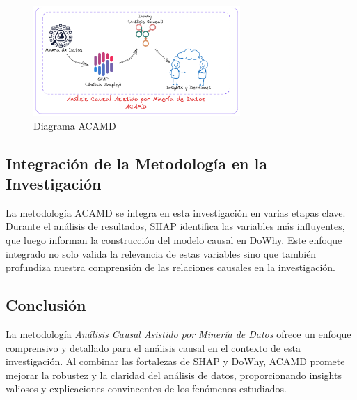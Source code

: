 \begin{figure}[H]
    \centering
    \includegraphics[width=0.7\textwidth]{img/diagramas_Tesis_ACAMD-Propuesta.png}
    \caption{Diagrama ACAMD}
    \label{fig:diagrama_ACAMD}
  \end{figure}

\subsection{Integración de la Metodología en la Investigación}\label{subsec:integracion-metodologia}

La metodología ACAMD se integra en esta investigación en varias etapas clave. Durante el análisis de resultados, SHAP identifica las variables más influyentes, que luego informan la construcción del modelo causal en DoWhy. Este enfoque integrado no solo valida la relevancia de estas variables sino que también profundiza nuestra comprensión de las relaciones causales en la investigación.

\subsection{Conclusión}\label{subsec:conclusion-metodologia}

La metodología \textit{Análisis Causal Asistido por Minería de Datos} ofrece un enfoque comprensivo y detallado para el análisis causal en el contexto de esta investigación. Al combinar las fortalezas de SHAP y DoWhy, ACAMD promete mejorar la robustez y la claridad del análisis de datos, proporcionando insights valiosos y explicaciones convincentes de los fenómenos estudiados.
